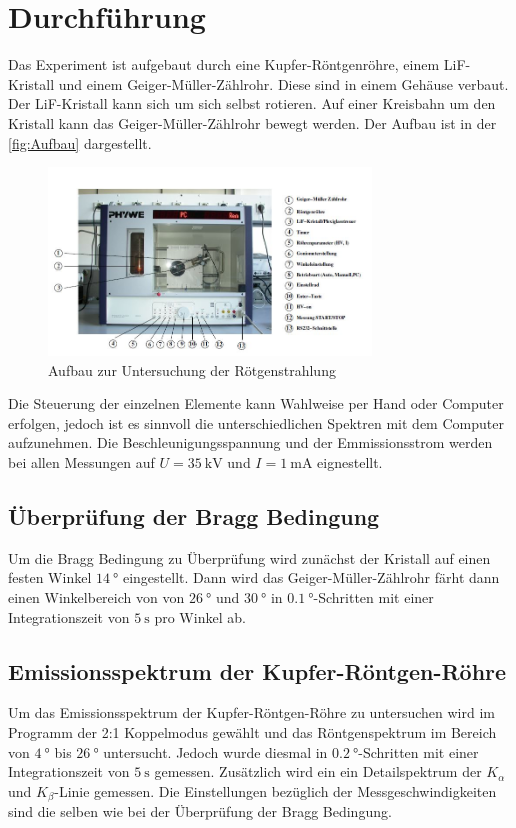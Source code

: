 \newpage
\section{Durchführung}
Das Experiment ist aufgebaut durch eine Kupfer-Röntgenröhre, einem LiF-Kristall und einem Geiger-Müller-Zählrohr. Diese sind in einem Gehäuse verbaut. Der LiF-Kristall kann sich um sich 
selbst rotieren. Auf einer Kreisbahn um den Kristall kann das Geiger-Müller-Zählrohr bewegt werden. Der Aufbau ist in der \autoref{fig:Aufbau} dargestellt.

\begin{figure}
    \centering
    \includegraphics[height=5cm]{content/mess.JPG}
    \caption{Aufbau zur Untersuchung der Rötgenstrahlung}
    \label{fig:Aufbau}
\end{figure}

\noindent
Die Steuerung der einzelnen Elemente kann Wahlweise per Hand oder Computer erfolgen, jedoch ist es sinnvoll die unterschiedlichen Spektren mit dem Computer aufzunehmen. Die Beschleunigungsspannung
und der Emmissionsstrom werden bei allen Messungen auf $U = \SI{35}{\kilo\volt}$ und $I = \SI{1}{\milli\ampere}$ eignestellt.

\subsection{Überprüfung der Bragg Bedingung}
Um die Bragg Bedingung zu Überprüfung wird zunächst der Kristall auf einen festen Winkel $\SI{14}{\degree}$ eingestellt. Dann wird das Geiger-Müller-Zählrohr färht dann einen Winkelbereich
von von $\SI{26}{\degree}$ und $\SI{30}{\degree}$ in $\SI{0.1}{\degree}$-Schritten mit einer Integrationszeit von $\SI{5}{\second}$ pro Winkel ab.

\subsection{Emissionsspektrum der Kupfer-Röntgen-Röhre}
\label{sub:emilit}
Um das Emissionsspektrum der Kupfer-Röntgen-Röhre zu untersuchen wird im Programm der 2:1 Koppelmodus gewählt und das Röntgenspektrum im Bereich von $\SI{4}{\degree}$ bis $\SI{26}{\degree}$
untersucht. Jedoch wurde diesmal in $\SI{0.2}{\degree}$-Schritten mit einer Integrationszeit von $\SI{5}{\second}$ gemessen.
Zusätzlich wird ein ein Detailspektrum der $K_\alpha$ und $K_\beta$-Linie gemessen. Die Einstellungen bezüglich der Messgeschwindigkeiten sind die selben wie bei der Überprüfung der Bragg Bedingung.

